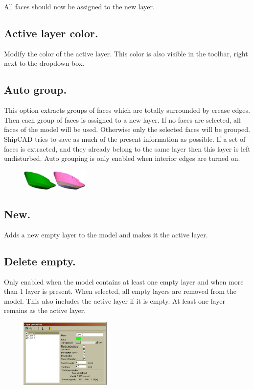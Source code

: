 \documentclass[12pt]{article}
\begin{document}
All faces should now be assigned to the new layer.

\subsection{Active layer color.}
Modify the color of the active layer. This color is also visible in
the toolbar, right next to the dropdown box.

\subsection{Auto group.}
This option extracts groups of faces which are totally surrounded by
crease edges. Then each group of faces is assigned to a new layer. If
no faces are selected, all faces of the model will be used. Otherwise
only the selected faces will be grouped. ShipCAD tries to save as much
of the present information as possible. If a set of faces is
extracted, and they already belong to the same layer then this layer
is left undisturbed. Auto grouping is only enabled when interior edges
are turned on.

\begin{figure}
        \centering
        \includegraphics[width=0.3\textwidth,natwidth=709,natheight=230]{newlayer.png}
        \caption{}
        \label{fig:newlayer}
\end{figure}

\subsection{New.}
Adds a new empty layer to the model and makes it the active layer.

\subsection{Delete empty.}
Only enabled when the model contains at least one empty layer and when
more than 1 layer is present. When selected, all empty layers are
removed from the model. This also includes the active layer if it is
empty. At least one layer remains as the active layer.

\begin{figure}
        \centering
        \includegraphics[width=0.4\textwidth,natwidth=559,natheight=423]{layerproperties.png}
        \caption{}
        \label{fig:layerproperties}
\end{figure}
\end{document}
